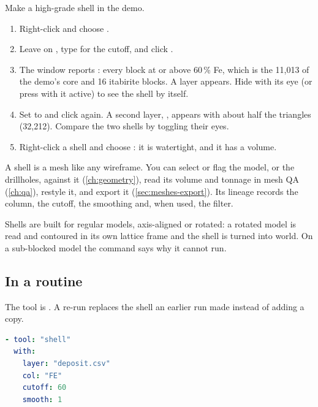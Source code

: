 \begin{tryit}
Make a high-grade shell in the demo.
\begin{enumerate}
\item Right-click  and choose .
\item Leave  on , type  for the cutoff, and click .
\item The window reports : every block at or above 60\,\% Fe, which is the 11,013 of the demo's  core and 16 itabirite blocks. A layer  appears. Hide  with its eye (or press  with it active) to see the shell by itself.
\item Set  to  and click  again. A second layer, , appears with about half the triangles (32,212). Compare the two shells by toggling their eyes.
\item Right-click a shell and choose : it is watertight, and it has a volume.
\end{enumerate}
\end{tryit}


A shell is a mesh like any wireframe. You can select or flag the model, or the drillholes, against it (\cref{ch:geometry}), read its volume and tonnage in mesh QA (\cref{ch:qa}), restyle it, and export it (\cref{sec:meshes-export}). Its lineage records the column, the cutoff, the smoothing and, when used, the filter.

Shells are built for regular models, axis-aligned or rotated: a rotated model is read and contoured in its own lattice frame and the shell is turned into world. On a sub-blocked model the command says why it cannot run.

\subsection{In a routine}

The tool is . A re-run replaces the shell an earlier run made instead of adding a copy.

\begin{lstlisting}[language=yaml]
- tool: "shell"
  with:
    layer: "deposit.csv"
    col: "FE"
    cutoff: 60
    smooth: 1
\end{lstlisting}

